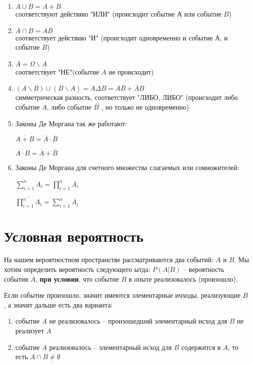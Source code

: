 \documentclass{article}
\begin{document}
\begin{enumerate}
\item $A \cup B = A + B$\\
      соответствуют действию "ИЛИ"  (происходит событие $А$ или событие $B$)

\item $A \cap B = AB$\\
      соответствует действию  "И"  (происходит одновременно и событие $А$, и событие $B$)

\item $\overline{A} = \Omega \backslash A$\\
      соответствует "НЕ"(событие $A$ не происходит)

\item $(A \backslash B) \cup (B \backslash A) = A \Delta B =  A\overline{B} + \overline{A}B$\\
      симметрическая разность, соответствует "ЛИБО, ЛИБО" (происходит либо событие $A$, либо событие $B$ , но только не одновременно)

\item Законы Де Моргана так же работают:

\quad $\overline{A + B} = \overline{A} \cdot \overline{B}$

\quad $\overline{A \cdot B} = \overline{A} + \overline{B}$

\item Законы Де Моргана для счетного множества слагаемых или сомножителей:

\quad $ \overline{\sum\limits_{i = 1}^n A_i} = \prod\limits_{i =1}^n \overline{A_i}$

\quad $\overline{\prod\limits_{i = 1}^n A_i} = \sum\limits_{i = 1}^n \overline{A_i}$

\end{enumerate}

\section{Условная вероятность}

На нашем вероятностном пространстве рассматриваются два событий: $A$ и $B$. Мы хотим определить вероятность следующего ытда: $P(A | B)$ -- вероятность события $A$, \textbf{при условии}, что событие $B$ в опыте реализовалось (произошло).

Если событие произошло, значит имеются элементарные ичходы, реализующие $B$, а значит дальше есть два варианта:

\begin{enumerate}
\item событие $A$ не реализовалось -- произошедший элементарный исход для $B$ не реализует $A$

\item событие $A$ реализовалось -- элементарный исход для $B$ содержится в $A$, то есть $A \cap B \not= \emptyset$

\end{enumerate}
\end{document}
